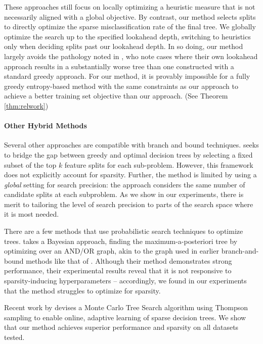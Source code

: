These approaches still focus on locally optimizing a heuristic measure that is not necessarily aligned with a global objective. By contrast, our method selects splits to directly optimize the sparse misclassification rate of the final tree. We globally optimize the search up to the specified lookahead depth, switching to heuristics only when deciding splits past our lookahead depth. In so doing, our method largely avoids the pathology noted in \citet{murthy1995lookahead}, who note cases where their own lookahead approach results in a substantially worse tree than one constructed with a standard greedy approach. For our method, it is provably impossible for a fully greedy entropy-based method with the same constraints as our approach to achieve a better training set objective than our approach. (See Theorem \ref{thm:relwork})

\paragraph{Other Hybrid Methods}
Several other approaches are compatible with branch and bound techniques. \citet{topk} seeks to bridge the gap between greedy and optimal decision trees by selecting a fixed subset of the top $k$ feature splits for each sub-problem.
However, this framework does not explicitly account for sparsity. Further, the method is limited by using a \textit{global} setting for search precision: the approach considers the same number of candidate splits at each subproblem. As we show in our experiments, there is merit to tailoring the level of search precision to parts of the search space where it is most needed. 

There are a few methods that use probabilistic search techniques to optimize trees. \citet{maptree} takes a Bayesian approach, finding the maximum-a-posteriori tree by optimizing over an AND/OR graph, akin to the graph used in earlier branch-and-bound methods like that of \citet{gosdt}. Although their method demonstrates strong performance, their experimental results reveal that it is not responsive to sparsity-inducing hyperparameters -- accordingly, we found in our experiments that the method struggles to optimize for sparsity.

Recent work by \citet{thompson_aistats} devises a Monte Carlo Tree Search algorithm using Thompson sampling to enable online, adaptive learning of sparse decision trees. 
We show that our method achieves superior performance and sparsity on all datasets tested.
